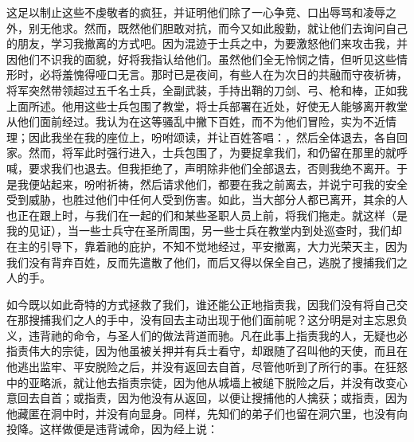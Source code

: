 这足以制止这些不虔敬者的疯狂，并证明他们除了一心争竞、口出辱骂和凌辱之外，别无他求。然而，既然他们胆敢对抗，而今又如此殷勤，就让他们去询问自己的朋友，学习我撤离的方式吧。因为混迹于士兵之中，为要激怒他们来攻击我，并因他们不识我的面貌，好将我指认给他们。虽然他们全无怜悯之情，但听见这些情形时，必将羞愧得哑口无言。那时已是夜间，有些人在为次日的共融而守夜祈祷，将军突然带领超过五千名士兵，全副武装，手持出鞘的刀剑、弓、枪和棒，正如我上面所述。他用这些士兵包围了教堂，将士兵部署在近处，好使无人能够离开教堂从他们面前经过。我认为在这等骚乱中撇下百姓，而不为他们冒险，实为不近情理；因此我坐在我的座位上，吩咐颂读，并让百姓答唱：，然后全体退去，各自回家。然而，将军此时强行进入，士兵包围了，为要捉拿我们，和仍留在那里的就呼喊，要求我们也退去。但我拒绝了，声明除非他们全部退去，否则我绝不离开。于是我便站起来，吩咐祈祷，然后请求他们，都要在我之前离去，并说宁可我的安全受到威胁，也胜过他们中任何人受到伤害。如此，当大部分人都已离开，其余的人也正在跟上时，与我们在一起的们和某些圣职人员上前，将我们拖走。就这样（是我的见证），当一些士兵守在圣所周围，另一些士兵在教堂内到处巡查时，我们却在主的引导下，靠着祂的庇护，不知不觉地经过，平安撤离，大力光荣天主，因为我们没有背弃百姓，反而先遣散了他们，而后又得以保全自己，逃脱了搜捕我们之人的手。\par

\par

如今既以如此奇特的方式拯救了我们，谁还能公正地指责我，因我们没有将自己交在那搜捕我们之人的手中，没有回去主动出现于他们面前呢？这分明是对主忘恩负义，违背祂的命令，与圣人们的做法背道而驰。凡在此事上指责我的人，无疑也必指责伟大的宗徒，因为他虽被关押并有兵士看守，却跟随了召叫他的天使，而且在他逃出监牢、平安脱险之后，并没有返回去自首，尽管他听到了所行的事。在狂怒中的亚略派，就让他去指责宗徒，因为他从城墙上被缒下脱险之后，并没有改变心意回去自首；或指责，因为他没有从返回，以便让搜捕他的人擒获；或指责，因为他藏匿在洞中时，并没有向显身。同样，先知们的弟子们也留在洞穴里，也没有向投降。这样做便是违背诫命，因为经上说：\par

